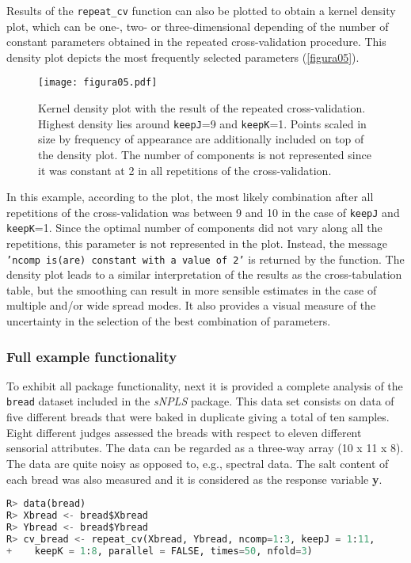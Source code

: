 Results of the \texttt{repeat\_cv} function can also be plotted to obtain a kernel density plot, which can be one-, two- or three-dimensional depending of the number of constant parameters obtained in the repeated cross-validation procedure. This density plot depicts the most frequently selected parameters (\autoref{figura05}). 
\vspace{10pt}
\begin{figure}[hbtp]
	\centering
\texttt{[image: figura05.pdf]}
\caption[Kernel density plot with the results of repeated cross-validation]{Kernel density plot with the result of the repeated cross-validation. Highest density lies around \texttt{keepJ}=9 and \texttt{keepK}=1. Points scaled in size by frequency of appearance are additionally included on top of the density plot. The number of components is not represented since it was constant at 2 in all repetitions of the cross-validation.}
\label{figura05}
\end{figure}

In this example, according to the plot, the most likely combination after all repetitions of the cross-validation was between 9 and 10 in the case of \texttt{keepJ} and \texttt{keepK}=1. Since the optimal number of components did not vary along all the repetitions, this parameter is not represented in the plot. Instead, the message \texttt{'ncomp is(are) constant with a value of 2'} is returned by the function. The density plot leads to a similar interpretation of the results as the cross-tabulation table, but the smoothing can result in more sensible estimates in the case of multiple and/or wide spread modes. It also provides a visual measure of the uncertainty in the selection of the best combination of parameters.

\subsubsection{Full example functionality}
To exhibit all package functionality, next it is provided a complete analysis of the \texttt{bread} dataset \parencite{bro1998multi} included in the \textit{sNPLS} package. This data set consists on data of five different breads that were baked in duplicate giving a total of ten samples. Eight different judges assessed the breads with respect to eleven different sensorial attributes. The data can be regarded as a three-way array (10 x 11 x 8). The data are quite noisy as opposed to, e.g., spectral data. The salt content of each bread was also measured and it is considered as the response variable \textbf{y}.
\vspace{15pt}
\begin{lstlisting}[basicstyle=\small, language=Python, morekeywords={data, repeat_cv}]
R> data(bread)
R> Xbread <- bread$Xbread
R> Ybread <- bread$Ybread
R> cv_bread <- repeat_cv(Xbread, Ybread, ncomp=1:3, keepJ = 1:11,   
+    keepK = 1:8, parallel = FALSE, times=50, nfold=3)
\end{lstlisting}

